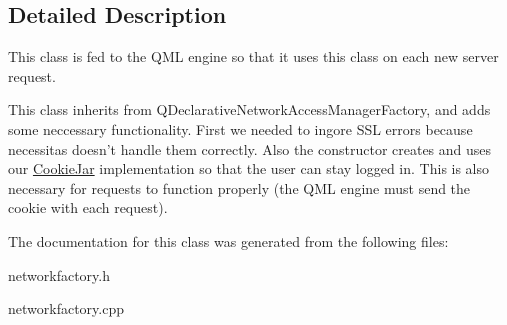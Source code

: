 \subsection{Detailed Description}
This class is fed to the Q\-M\-L engine so that it uses this class on each new server request. 

This class inherits from Q\-Declarative\-Network\-Access\-Manager\-Factory, and adds some neccessary functionality. First we needed to ingore S\-S\-L errors because necessitas doesn't handle them correctly. Also the constructor creates and uses our \hyperlink{classCookieJar}{Cookie\-Jar} implementation so that the user can stay logged in. This is also necessary for requests to function properly (the Q\-M\-L engine must send the cookie with each request). 

The documentation for this class was generated from the following files\-:\begin{DoxyCompactItemize}
\item 
networkfactory.\-h\item 
networkfactory.\-cpp\end{DoxyCompactItemize}
